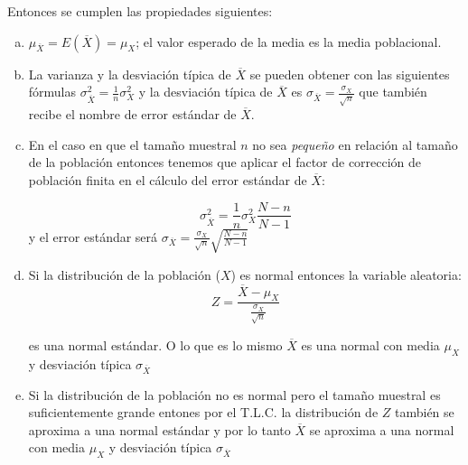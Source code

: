\documentclass[12pt]{report}
\begin{document}
Entonces se cumplen las propiedades siguientes:

\begin{enumerate}[a)]
\item $\mu_{\overline{X}}=E(\overline{X})=\mu_{X}$; el valor esperado de la media es la media poblacional.
\item La varianza y la desviación típica de $\overline{X}$ se pueden obtener con las siguientes fórmulas $\sigma_{\overline{X}}^2=\frac{1}{n}\sigma_{X}^2$
 y  la desviación típica de $\overline{X}$ es $\sigma_{\overline{X}}=
 \frac{\sigma_{X}}{\sqrt{n}}$
 que también recibe el nombre de error estándar de $\overline{X}$.

\item En el caso en que el tamaño muestral $n$ no sea
\emph{pequeño} en relación al tamaño de la población  entonces
  tenemos que aplicar el factor de corrección de población finita en
  el cálculo del error estándar de $\overline{X}$:

 $$\sigma_{\overline{X}}^2=\frac{1}{n}\sigma_{X}^2\frac{N-n}{N-1}$$
 y  el error estándar será
 $\sigma_{\overline{X}}=\frac{\sigma_{X}}{\sqrt{n}}\sqrt{\frac{N-n}{N-1}}$
 \item Si la distribución de la población ($X$) es normal entonces
 la variable aleatoria:
 $$Z=\frac{\overline{X}-\mu_{X}}{\frac{\sigma_{X}}{\sqrt{n}}}$$

 es una normal estándar. O lo que es lo mismo $\overline{X}$ es una
 normal con media $\mu_{X}$ y  desviación típica
 $\sigma_{\overline{X}}$
 \item Si la distribución de la población no es normal pero el tamaño
 muestral es suficientemente grande entones por el T.L.C.
 la distribución de $Z$ también se aproxima a una normal estándar y
 por lo tanto $\overline{X}$ se aproxima a una
 normal con media $\mu_{X}$ y  desviación típica
 $\sigma_{\overline{X}}$
\end{enumerate}
\end{document}
